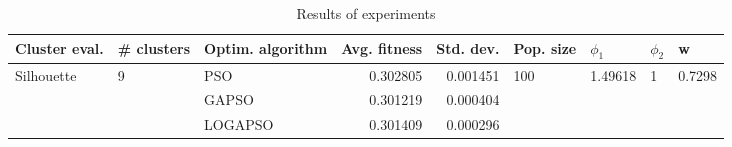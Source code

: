 \begin{table}
\centering
\caption{Results of experiments}
\begin{tabular}{lllrrllll}
\toprule
              Cluster eval. &        \# clusters & Optim. algorithm &  Avg. fitness &  Std. dev. &            Pop. size &               $\phi_{1}$ &         $\phi_{2}$ &                       w \\
\midrule
\multirow{3}{*}{Silhouette} & \multirow{3}{*}{9} &              PSO &      0.302805 &   0.001451 & \multirow{3}{*}{100} & \multirow{3}{*}{1.49618} & \multirow{3}{*}{1} & \multirow{3}{*}{0.7298} \\
                            &                    &            GAPSO &      0.301219 &   0.000404 &                      &                          &                    &                         \\
                            &                    &          LOGAPSO &      0.301409 &   0.000296 &                      &                          &                    &                         \\
\bottomrule
\end{tabular}
\end{table}
